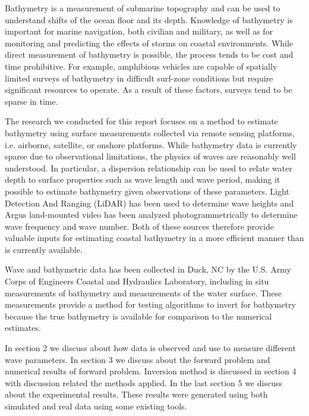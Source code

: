 Bathymetry is a measurement of submarine topography and can be used to understand shifts of the ocean floor and its depth. Knowledge of bathymetry is important for marine navigation, both civilian and military, as well as for monitoring and predicting the effects of storms on coastal environments. While direct measurement of bathymetry is possible, the process tends to be cost and time prohibitive. For example, amphibious vehicles are capable of spatially limited surveys of bathymetry in difficult surf-zone conditions but require significant resources to operate. As a result of these factors, surveys tend to be sparse in time. 

The research we conducted for this report focuses on a method to estimate bathymetry using surface measurements collected via remote sensing platforms, i.e. airborne, satellite, or onshore platforms. While bathymetry data is currently sparse due to observational limitations, the physics of waves are reasonably well understood. In particular, a dispersion relationship can be used to relate water depth to surface properties such as wave length and wave period, making it possible to estimate bathymetry given observations of these parameters. Light Detection And Ranging (LiDAR) has been used to determine wave heights and Argus land-mounted video has been analyzed photogrammetrically to determine wave frequency and wave number. Both of these sources therefore provide valuable inputs for estimating coastal bathymetry in a more efficient manner than is currently available.

Wave and bathymetric data has been collected in Duck, NC by the U.S. Army Corps of Engineers Coastal and Hydraulics Laboratory, including in situ measurements of bathymetry and measurements of the water surface. These measurements provide a method for testing algorithms to invert for bathymetry because the true bathymetry is available for comparison to the numerical estimates.

In section 2 we discuss about how data is observed and use to measure different wave parameters. In section 3 we discuss about the forward problem and numerical results of forward problem. Inversion method is discussed in section 4 with discussion related the methods applied. In the last section 5 we discuss about the experimental results. These results were generated using both simulated and real data using some existing tools.